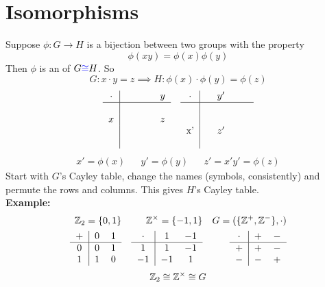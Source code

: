 \documentclass[openany]{report}
\begin{document}
\section{Isomorphisms}
Suppose $\phi: G \rightarrow H$ is a bijection between two groups with the property 
$$\phi(xy) = \phi(x)\phi(y)$$
Then $\phi$ is an  of $G \textcolor{blue}{\cong} H$. So
$$G: x \cdot y = z \implies H: \phi(x) \cdot \phi(y) = \phi (z)$$
\begin{align*}
    \begin{tabular}{c|cccc}
       $\cdot$  & &  &  & $y$  \\
       \hline
                & &  &  &  \\ 
            $x$ &  & &  & $z$\\
            \\
            \\
    \end{tabular} &&
        \begin{tabular}{c|cccc}
       $\cdot$  &  & $y'$ &  &   \\
       \hline
                &   &  &  &  \\ 
              &  & &  & \\
            x'&  & $z'$&  &
            \\
            \\
    \end{tabular}\\
\end{align*}
\begin{align*}
    x' = \phi(x) && y' = \phi(y) && z' = x'y' = \phi(z)
\end{align*}
Start with $G$'s Cayley table, change the names (symbols, consistently) and permute the rows and columns. This gives $H$'s Cayley table.\\[3ex]

\textbf{Example:}
\begin{align*}
    \ints_2 = \{0,1\} && \ints^\times = \{-1,1\} && G = (\{\ints^+, \ints^-\}, \cdot)\\
    \begin{tabular}{c|cc}
        + & $0$ & $1$  \\
        \hline
         $0$& $0$ & $1$\\
         $1$ & $1$ & $0$
    \end{tabular} &&    
    \begin{tabular}{c|cc}
        $\cdot$ & $1$ & $-1$  \\
        \hline
         $1$& $1$ & $-1$\\
         $-1$ & $-1$ & $1$
    \end{tabular} &&
    \begin{tabular}{c|cc}
        $\cdot$ & $+$ & $-$  \\
        \hline
         $+$& $+$ & $-$\\
         $-$ & $-$ & $+$
    \end{tabular}
\end{align*}
$$\mathbb{Z}_2 \cong \mathbb{Z}^\times \cong G$$
\end{document}
